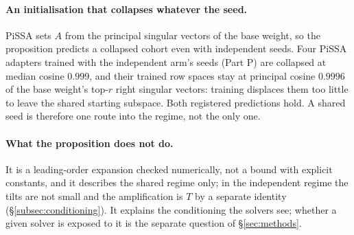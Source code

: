 \paragraph{An initialisation that collapses whatever the seed.} PiSSA sets $A$
from the principal singular vectors of the base weight, so the proposition
predicts a collapsed cohort even with independent seeds. Four PiSSA adapters
trained with the independent arm's seeds (Part P) are collapsed at median
cosine $0.999$, and their trained row spaces stay at principal cosine $0.9996$
of the base weight's top-$r$ right singular vectors: training displaces them
too little to leave the shared starting subspace. Both registered predictions
hold. A shared seed is therefore one route into the regime, not the only one.

\paragraph{What the proposition does not do.} It is a leading-order
expansion checked numerically, not a bound with explicit constants, and it
describes the shared regime only; in the independent regime the tilts are not
small and the amplification is $T$ by a separate identity
(\S\ref{subsec:conditioning}). It explains the conditioning the solvers see;
whether a given solver is exposed to it is the separate question of
\S\ref{sec:methods}.
